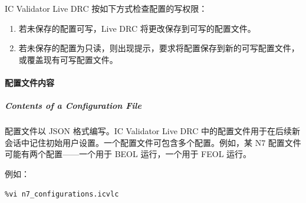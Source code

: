 
IC Validator Live DRC 按如下方式检查配置的写权限：
\begin{enumerate}[label=\alph*.]
  \item 若未保存的配置可写，Live DRC 将更改保存到可写的配置文件。
  \item 若未保存的配置为只读，则出现提示，要求将配置保存到新的可写配置文件，或覆盖现有可写配置文件。
\end{enumerate}



\paragraph{配置文件内容}
\subparagraph*{Contents of a Configuration File}

配置文件以 JSON 格式编写。IC Validator Live DRC 中的配置文件用于在后续新会话中记住初始用户设置。一个配置文件可包含多个配置。例如，某 N7 配置文件可能有两个配置——一个用于 BEOL 运行，一个用于 FEOL 运行。

例如：
\begin{lstlisting}
%vi n7_configurations.icvlc
\end{lstlisting}

